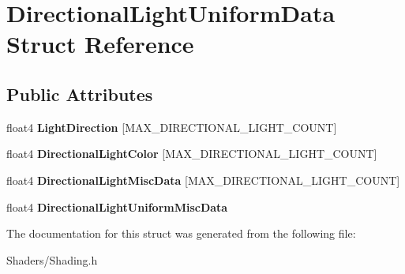 \hypertarget{structDirectionalLightUniformData}{}\section{Directional\+Light\+Uniform\+Data Struct Reference}
\label{structDirectionalLightUniformData}
\subsection*{Public Attributes}
\begin{DoxyCompactItemize}
\item 
\mbox{\label{structDirectionalLightUniformData_aab45f31574da2c2992dc59e833aa7f1f}} 
float4 {\bfseries Light\+Direction} \mbox{[}M\+A\+X\+\_\+\+D\+I\+R\+E\+C\+T\+I\+O\+N\+A\+L\+\_\+\+L\+I\+G\+H\+T\+\_\+\+C\+O\+U\+NT\mbox{]}
\item 
\mbox{\label{structDirectionalLightUniformData_ae2131f65aa16eeb84ab188dc294d664c}} 
float4 {\bfseries Directional\+Light\+Color} \mbox{[}M\+A\+X\+\_\+\+D\+I\+R\+E\+C\+T\+I\+O\+N\+A\+L\+\_\+\+L\+I\+G\+H\+T\+\_\+\+C\+O\+U\+NT\mbox{]}
\item 
\mbox{\label{structDirectionalLightUniformData_a47c6e4c1a174ff7d726d7d967b51dfa9}} 
float4 {\bfseries Directional\+Light\+Misc\+Data} \mbox{[}M\+A\+X\+\_\+\+D\+I\+R\+E\+C\+T\+I\+O\+N\+A\+L\+\_\+\+L\+I\+G\+H\+T\+\_\+\+C\+O\+U\+NT\mbox{]}
\item 
\mbox{\label{structDirectionalLightUniformData_a8383d09be7f0445d2404e03601b2b144}} 
float4 {\bfseries Directional\+Light\+Uniform\+Misc\+Data}
\end{DoxyCompactItemize}


The documentation for this struct was generated from the following file\+:\begin{DoxyCompactItemize}
\item 
Shaders/Shading.\+h\end{DoxyCompactItemize}
